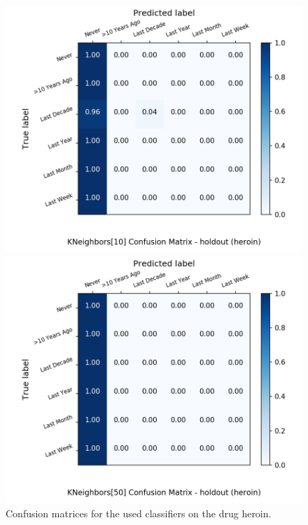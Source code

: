 \begin{figure}[H]
\begin{minipage}[b]{0.32\textwidth}
		\includegraphics[width=1.1\textwidth]{Plots/drugs/heroin_KNeighbors_10_balance_False_holdout.png}
  \end{minipage}
	\begin{minipage}[b]{0.32\textwidth}
		\includegraphics[width=1.1\textwidth]{Plots/drugs/heroin_KNeighbors_50_balance_False_holdout.png}
  \end{minipage}
	\caption{Confusion matrices for the used classifiers on the drug heroin.}
\end{figure}

